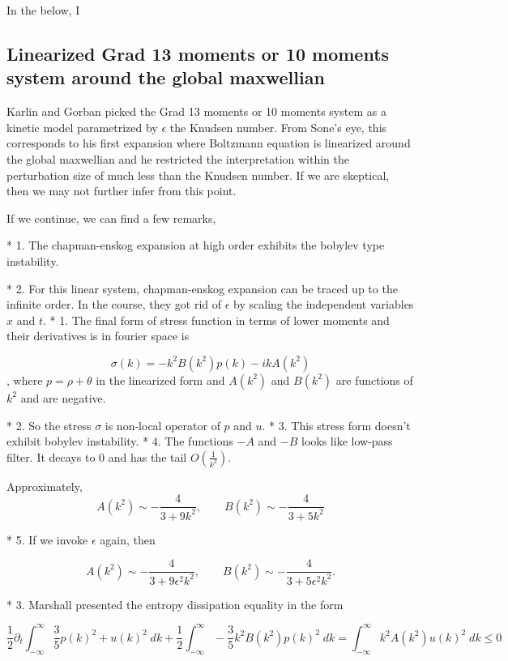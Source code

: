 \documentclass[a4paper,12pt]{article}
\begin{document}
In the below, I 


\subsection{Linearized Grad 13 moments or 10 moments system around the global maxwellian}
Karlin and Gorban picked the Grad 13 moments or 10 moments system as a kinetic model parametrized by $\epsilon$ the Knudsen number. From Sone's eye, this corresponds to his first expansion where Boltzmann equation is linearized around the global maxwellian and he restricted the interpretation within the perturbation size of much less than the Knudsen number. If we are skeptical, then we may not further infer from this point.

If we continue, we can find a few remarks,

 * 1. The chapman-enskog expansion at high order exhibits the bobylev type instability.

 * 2. For this linear system, chapman-enskog expansion can be traced up to the infinite order. In the course, they got rid of $\epsilon$ by scaling the independent variables $x$ and $t$.
  * 1. The final form of stress function in terms of lower moments and their derivatives is in fourier space is

{{{ $$\sigma(k) = - k^2 B(k^2) p(k) - i k A(k^2) $$ }}}, where $p = \rho + \theta$ in the linearized form and {{{$A(k^2)$}}} and {{{$B(k^2)$}}} are functions of {{{$k^2$}}} and are negative.

  * 2. So the stress $\sigma$ is non-local operator of $p$ and $u$.
  * 3. This stress form doesn't exhibit bobylev instability.
  * 4. The functions $-A$ and $-B$ looks like low-pass filter. It decays to $0$ and has the tail {{{$O(\frac{1}{k^2})$}}}.


Approximately, {{{ $$ A(k^2) \sim -\frac{4}{3 + 9k^2}, \qquad B(k^2) \sim -\frac{4}{3 + 5k^2} $$ }}}

  * 5. If we invoke $\epsilon$ again, then

{{{ $$ A(k^2) \sim -\frac{4}{3 + 9\epsilon^2 k^2}, \qquad B(k^2) \sim -\frac{4}{3 + 5\epsilon^2 k^2}. $$ }}}

 * 3. Marshall presented the entropy dissipation equality in the form

{{{ $$ \frac{1}{2} \partial_t \int_{-\infty}^{\infty} \frac{3}{5} p(k)^2 + u(k)^2 \; dk + \frac{1}{2} \int_{-\infty}^{\infty} -\frac{3}{5}k^2 B(k^2)p(k)^2 \; dk = \int_{-\infty}^{\infty} k^2 A(k^2) u(k)^2 \; dk \le 0 $$}}}
\end{document}
